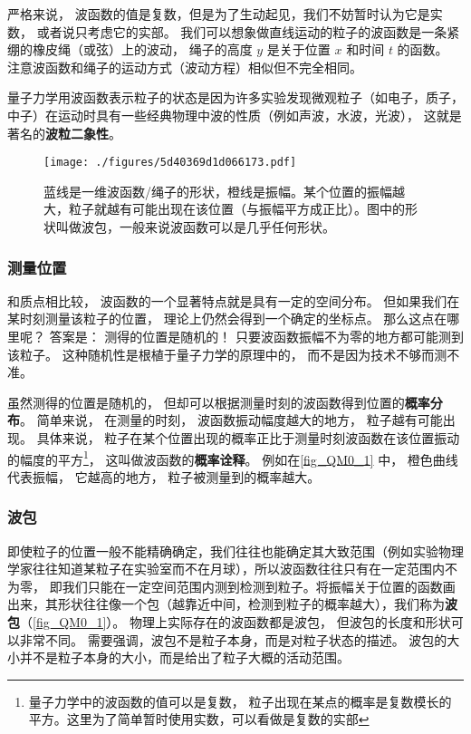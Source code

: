 严格来说， 波函数的值是复数，但是为了生动起见，我们不妨暂时认为它是实数， 或者说只考虑它的实部。 我们可以想象做直线运动的粒子的波函数是一条紧绷的橡皮绳（或弦）上的波动， 绳子的高度 $y$ 是关于位置 $x$ 和时间 $t$ 的函数。 注意波函数和绳子的运动方式（波动方程）相似但不完全相同。

量子力学用波函数表示粒子的状态是因为许多实验发现微观粒子（如电子，质子，中子）在运动时具有一些经典物理中波的性质（例如声波，水波，光波）， 这就是著名的\textbf{波粒二象性}。

\begin{figure}[ht]
\centering
\texttt{[image: ./figures/5d40369d1d066173.pdf]}
\caption{蓝线是一维波函数/绳子的形状，橙线是振幅。某个位置的振幅越大，粒子就越有可能出现在该位置（与振幅平方成正比）。图中的形状叫做波包，一般来说波函数可以是几乎任何形状。} \label{fig_QM0_1}
\end{figure}




\subsubsection{测量位置}
和质点相比较， 波函数的一个显著特点就是具有一定的空间分布。 但如果我们在某时刻测量该粒子的位置， 理论上仍然会得到一个确定的坐标点。 那么这点在哪里呢？ 答案是： 测得的位置是随机的！ 只要波函数振幅不为零的地方都可能测到该粒子。 这种随机性是根植于量子力学的原理中的， 而不是因为技术不够而测不准。

虽然测得的位置是随机的， 但却可以根据测量时刻的波函数得到位置的\textbf{概率分布}。 简单来说， 在测量的时刻， 波函数振动幅度越大的地方， 粒子越有可能出现。 具体来说， 粒子在某个位置出现的概率正比于测量时刻波函数在该位置振动的幅度的平方\footnote{量子力学中的波函数的值可以是复数， 粒子出现在某点的概率是复数模长的平方。这里为了简单暂时使用实数，可以看做是复数的实部}， 这叫做波函数的\textbf{概率诠释}。 例如在\autoref{fig_QM0_1} 中， 橙色曲线代表振幅， 它越高的地方， 粒子被测量到的概率越大。

\subsubsection{波包}
即使粒子的位置一般不能精确确定，我们往往也能确定其大致范围（例如实验物理学家往往知道某粒子在实验室而不在月球），所以波函数往往只有在一定范围内不为零， 即我们只能在一定空间范围内测到检测到粒子。将振幅关于位置的函数画出来，其形状往往像一个包（越靠近中间，检测到粒子的概率越大），我们称为\textbf{波包}（\autoref{fig_QM0_1}）。 物理上实际存在的波函数都是波包， 但波包的长度和形状可以非常不同。 需要强调，波包不是粒子本身，而是对粒子状态的描述。 波包的大小并不是粒子本身的大小，而是给出了粒子大概的活动范围。

